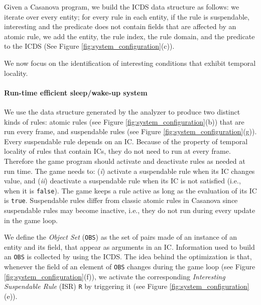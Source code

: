 Given a Casanova program, we build the ICDS data structure as follows: we iterate over every entity; for every rule in each entity, if the rule is suspendable, interesting and the predicate does not contain fields that are affected by an atomic rule, we add the entity, the rule index, the rule domain, and the predicate to the ICDS (See Figure \ref{fig:system_configuration}(c)).

We now focus on the identification of interesting conditions that exhibit temporal locality.

\paragraph*{Run-time efficient sleep/wake-up system}

We use the data structure generated by the analyzer to produce two distinct kinds of rules: atomic rules (see Figure \ref{fig:system_configuration}(b)) that are run every frame, and suspendable rules (see Figure \ref{fig:system_configuration}(g)). Every suspendable rule depends on an IC. %
Because of the property of temporal locality of rules that contain ICs, they do not need to run at every frame. Therefore the game program should activate and deactivate rules as needed at run time. The game needs to: (\textit{i}) activate a suspendable rule when its IC changes value, and (\textit{ii}) deactivate a suspendable rule when its IC is not satisfied (i.e., when it is \texttt{false}). The game keeps a rule active as long as the evaluation of its IC is \texttt{true}. Suspendable rules differ from classic atomic rules in Casanova since suspendable rules may become inactive, i.e., they do not run during every update in the game loop.

We define the \emph{Object Set} (\texttt{OBS}) as the set of pairs made of an instance of an entity and its field, that appear as arguments in an IC. Information used to build an \texttt{OBS} is collected by using the ICDS. The idea behind the optimization is that, whenever the field of an element of \texttt{OBS} changes during the game loop (see Figure \ref{fig:system_configuration}(f)), we activate the corresponding \emph{Interesting Suspendable Rule} (ISR) \texttt{R} by triggering it (see Figure \ref{fig:system_configuration}(e)).

